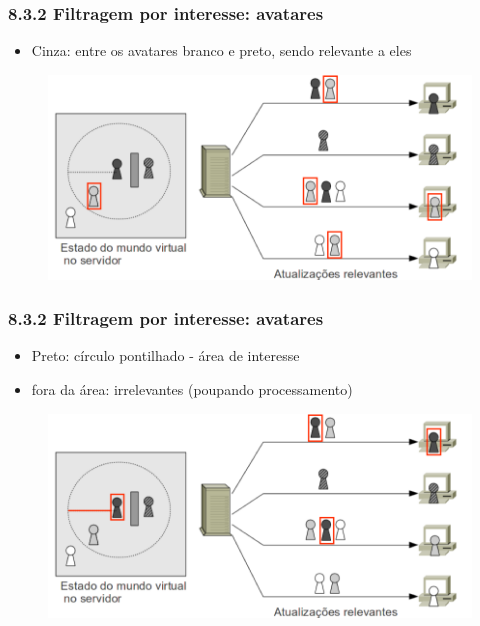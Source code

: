 \documentclass{beamer}
\begin{document}
\begin{frame} 
  \frametitle{8.3.2 Filtragem por interesse: avatares}
  \begin{itemize}
    \item Cinza: entre os avatares branco e preto, sendo relevante a eles
  \end{itemize}
  \begin{figure}[h]
    \centering
    \vspace{-18pt}
    \includegraphics[width=1.03\textwidth]{imagem_82_Cinza.png}
    \vspace{-20pt}
  \end{figure}
\end{frame}

\begin{frame} 
  \frametitle{8.3.2 Filtragem por interesse: avatares}
  \begin{itemize}
    \item Preto: círculo pontilhado - área de interesse
    \item fora da área: irrelevantes (poupando processamento)
  \end{itemize}
  \begin{figure}[h]
    \centering
    \vspace{-18pt}
    \includegraphics[width=1.03\textwidth]{imagem_82_Preto.png}
    \vspace{-20pt}
  \end{figure}
\end{frame}
\end{document}
